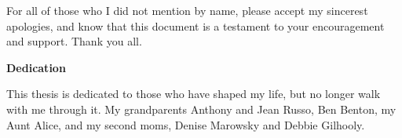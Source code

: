 For all of those who I did not mention by name, please accept my sincerest apologies, and know that this document is a testament to your encouragement and support. Thank you all.

\cleardoublepage
\newpage


\begin{center}\textbf{Dedication}\end{center}

This thesis is dedicated to those who have shaped my life, but no longer walk with me through it. My grandparents Anthony and Jean Russo, Ben Benton, my Aunt Alice, and my second moms, Denise Marowsky and Debbie Gilhooly.  

\cleardoublepage
\newpage

\renewcommand\contentsname{Table of Contents}
\tableofcontents
\cleardoublepage
{}

\listoftables
\cleardoublepage
{}		%

\listoffigures
\cleardoublepage
{}		%



